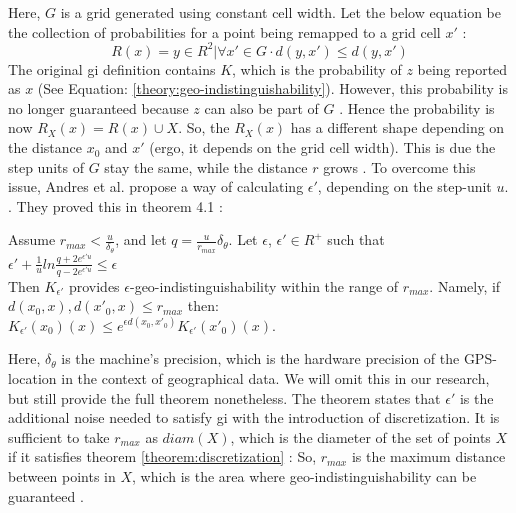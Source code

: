 Here, $G$ is a grid generated using constant cell width.
Let the below equation be the collection of probabilities for a point being remapped to a grid cell $x'$ \citep{DBLP:journals/corr/abs-1212-1984}:
\begin{equation}
  R(x) = { y \in R^2 | \forall x' \in G \cdot d(y, x') \leq d(y, x')}
  \label{eq:grid-probability}
\end{equation}
The original \gls{gi} definition contains $K$, which is the probability of $z$ being reported as $x$ (See Equation: \ref{theory:geo-indistinguishability}).
However, this probability is no longer guaranteed because $z$ can also be part of $G$ \citep{DBLP:journals/corr/abs-1212-1984}.
Hence the probability is now $R_X(x) = R(x) \cup X$. \newline
So, the $R_X(x)$ has a different shape depending on the distance $x_0$ and $x'$ (ergo, it depends on the grid cell width). This is due the step units of $G$ stay the same, while the distance $r$ grows \citep{DBLP:journals/corr/abs-1212-1984}.
\newpage
To overcome this issue, Andres et al. propose a way of calculating $\epsilon'$, depending on the step-unit $u$. \citep{DBLP:journals/corr/abs-1212-1984}.
They proved this in theorem 4.1 \citep{DBLP:journals/corr/abs-1212-1984}:
\begin{theorem}
  Assume $r_{max} < \frac{u}{\delta_{\theta}}$, and let $q = \frac{u}{r_{max}}\delta_{\theta}$. Let $\epsilon$, $\epsilon' \in R^+$ such that \\
  $\epsilon' + \frac{1}{u}ln \frac{q + 2 e^{\epsilon'u}}{q - 2 e^{\epsilon'u}} \leq \epsilon$ \\
  Then $K_{\epsilon'}$ provides $\epsilon$-geo-indistinguishability within the range of $r_{max}$. Namely, if ${d(x_0, x), d(x'_0, x) \leq r_{max}}$ then: \\
  $K_{\epsilon'}(x_0)(x) \leq e^{\epsilon d(x_0, x'_{0})} K_{\epsilon'}(x'_{0})(x)$.
  \label{theorem:discretization}
\end{theorem}
Here, $\delta_{\theta}$ is the machine's precision, which is the hardware precision of the GPS-location in the context of geographical data. We will omit this in our research, but still provide the full theorem nonetheless. 
The theorem states that $\epsilon'$ is the additional noise needed to satisfy \gls{gi} with the introduction of discretization.
It is sufficient to take $r_{max}$ as $diam(X)$, which is the diameter of the set of points $X$ if it satisfies theorem \ref{theorem:discretization} \citep{DBLP:journals/corr/abs-1212-1984}:
So, $r_{max}$ is the maximum distance between points in $X$, which is the area where geo-indistinguishability can be guaranteed \citep{9646489}.

